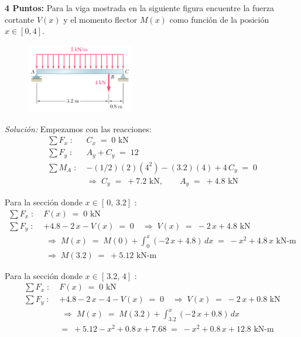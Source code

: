 \documentclass[ a4paper, twoside, 11pt]{article}
\begin{document}
\begin{problem}
\textbf{4 Puntos:} Para la viga mostrada en la siguiente figura encuentre la fuerza cortante $V(x)$ y el momento flector $M(x)$ como funci\'on de la posici\'on $x \in [0,4]$. 

\begin{figure}[htb]
\centering
\includegraphics[width=0.42\textwidth]{prob-vigas.jpg}
\end{figure}

\emph{Soluci\'on:} Empezamos con las reacciones: 
\begin{align*}
\sum F_x \; \colon \; & C_x \; = \; 0 \text{ kN} \\[1ex]
\sum F_y \; \colon \; & A_y + C_y \; = \; 12 \\[1ex]
\sum M_A \; \colon \;
& -(1/2)(2)(4^2) - (3.2)(4) + 4 \, C_y \; = \; 0 \\[1ex]
& \Longrightarrow \;
C_y \; = \; +7.2 \text{ kN}, \qquad
A_y \; = \; +4.8 \text{ kN}
\end{align*}

Para la secci\'on donde $x \in [ \, 0, \, 3.2]$ :
\begin{align*}
\sum F_x \; \colon \; & F(x) \; = \; 0 \text{ kN} \\[1ex]
\sum F_y \; \colon \;
& +4.8 - 2 \, x - V(x) \; = \; 0
\quad \Longrightarrow \;
V(x) \; = \; -2 \, x + 4.8 \text{ kN} \\[1ex]
& \; \Longrightarrow \;
M(x) \; = \; M(0) + \int_{0}^x (-2 \, x + 4.8) \, dx
\; = \; - x^2 + 4.8 \, x \text{ kN-m} \\[1ex]
& \; \Longrightarrow \;
M(3.2) \; = \; +5.12 \text{ kN-m}
\end{align*}

Para la secci\'on donde $x \in [ \, 3.2, \, 4]$ :
\begin{align*}
\sum F_x \; \colon \; & F(x) \; = \; 0 \text{ kN} \\[1ex]
\sum F_y \; \colon \;
& +4.8 - 2 \, x - 4 - V(x) \; = \; 0
\quad \Longrightarrow \;
V(x) \; = \; -2 \, x + 0.8 \text{ kN} \\[1ex]
& \; \Longrightarrow \;
M(x) \; = \; M(3.2) + \int_{3.2}^x (-2 \, x + 0.8) \, dx \\[1ex]
& = \; +5.12 - x^2 + 0.8 \, x + 7.68 \; = \;
- x^2 + 0.8 \, x + 12.8 \text{ kN-m} 
\end{align*}


\end{problem}
\end{document}
